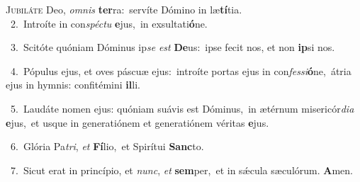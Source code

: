 \lettrine{\initial\textcolor{\initialcolor}{J}}{ubiláte} Deo, \textit{om}\-\textit{nis} \textbf{ter}\-ra:~\star servíte Dómino in læ\-\textbf{tí}\-tia.\\
{\numbfont\textcolor{\numbcolor}{~2.}}~Introíte in con\-\textit{spéc}\-\textit{tu} \textbf{e}\-jus,~\star in exsultati\-\textbf{ó}\-ne.\par
{\numbfont\textcolor{\numbcolor}{~3.}}~Scitóte quóniam Dóminus ip\textit{se} \textit{est} \textbf{De}\-us:~\star ipse fecit nos, et non \textbf{ip}\-si nos.\par
{\numbfont\textcolor{\numbcolor}{~4.}}~Pópulus ejus, et oves páscuæ ejus:~\dagger introíte portas ejus in con\-\textit{fes}\-\textit{si}\textbf{ó}ne,~\star átria ejus in hymnis: confitémini \textbf{il}\-li.\par
{\numbfont\textcolor{\numbcolor}{~5.}}~Laudáte nomen ejus: quóniam suávis est Dóminus,~\dagger in ætérnum misericór\-\textit{di}\-\textit{a} \textbf{e}\-jus,~\star et usque in generatiónem et generatiónem véritas \textbf{e}\-jus.\par
{\numbfont\textcolor{\numbcolor}{~6.}}~Glória Pa\-\textit{tri}\-, \textit{et} \textbf{Fí}\-lio,~\star et Spirítui \textbf{Sanc}\-to.\par
{\numbfont\textcolor{\numbcolor}{~7.}}~Sicut erat in princípio, et \textit{nunc}\-, \textit{et} \textbf{sem}\-per,~\star et in sǽcula sæculórum. \textbf{A}\-men.\par
